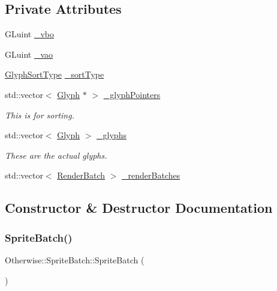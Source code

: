 \subsection*{Private Attributes}
\begin{DoxyCompactItemize}
\item 
G\+Luint \hyperlink{class_otherwise_1_1_sprite_batch_a3dc165276ddb8236b1b25f65a031dfd1}{\+\_\+vbo}
\item 
G\+Luint \hyperlink{class_otherwise_1_1_sprite_batch_a7f10dd2f06d1a2dddb1d39b154b3b4e0}{\+\_\+vao}
\item 
\hyperlink{namespace_otherwise_aa27b94bf7fe0e95dd17ed0a3506b12ee}{Glyph\+Sort\+Type} \hyperlink{class_otherwise_1_1_sprite_batch_a04ecf5e57634d10f014245dee9475d15}{\+\_\+sort\+Type}
\item 
std\+::vector$<$ \hyperlink{class_otherwise_1_1_glyph}{Glyph} $\ast$ $>$ \hyperlink{class_otherwise_1_1_sprite_batch_aaf7d70e727f9d649d94ae50001096804}{\+\_\+glyph\+Pointers}
\begin{DoxyCompactList}\small\item\em This is for sorting. \end{DoxyCompactList}\item 
std\+::vector$<$ \hyperlink{class_otherwise_1_1_glyph}{Glyph} $>$ \hyperlink{class_otherwise_1_1_sprite_batch_ad2a9cfb27737a5fe56e4e98dcfa0471c}{\+\_\+glyphs}
\begin{DoxyCompactList}\small\item\em These are the actual glyphs. \end{DoxyCompactList}\item 
std\+::vector$<$ \hyperlink{class_otherwise_1_1_render_batch}{Render\+Batch} $>$ \hyperlink{class_otherwise_1_1_sprite_batch_afea39b356cbf6fd85137c58ba7944e08}{\+\_\+render\+Batches}
\end{DoxyCompactItemize}


\subsection{Constructor \& Destructor Documentation}
\mbox{\label{class_otherwise_1_1_sprite_batch_a1d8cdf1c0316c66baf4c67dbb125e77f}} 
\subsubsection{\texorpdfstring{Sprite\+Batch()}{SpriteBatch()}}
{\footnotesize\ttfamily Otherwise\+::\+Sprite\+Batch\+::\+Sprite\+Batch (\begin{DoxyParamCaption}{ }\end{DoxyParamCaption})}

